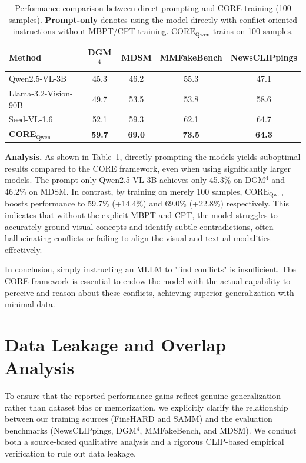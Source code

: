 \documentclass{article}
\theoremstyle{plain}
\theoremstyle{definition}
\theoremstyle{remark}
\begin{document}
\begin{table}[h]
\centering
\setlength{\tabcolsep}{4pt}
\caption{
Performance comparison between direct prompting and CORE training (100 samples). \textbf{Prompt-only} denotes using the model directly with conflict-oriented instructions without MBPT/CPT training. $\text{CORE}_\text{Qwen}$ trains on 100 samples.
}
\begin{tabular}{l cccc}
\toprule
\textbf{Method} & \textbf{DGM$^4$} & \textbf{MDSM} & \textbf{MMFakeBench} & \textbf{NewsCLIPpings} \\
\midrule

Qwen2.5-VL-3B & 45.3 & 46.2 & 55.3 & 47.1 \\
Llama-3.2-Vision-90B & 49.7 & 53.5 & 53.8 & 58.6 \\
Seed-VL-1.6 & 52.1 & 59.3 & 62.1 & 64.7 \\
\midrule

\rowcolor{LightGreen}
\textbf{CORE$_{\text{Qwen}}$} & \textbf{59.7} & \textbf{69.0} & \textbf{73.5} & \textbf{64.3} \\
\bottomrule
\end{tabular}
\small
\label{tab:prompt_vs_train}
\end{table}

\textbf{Analysis.} As shown in Table~\ref{tab:prompt_vs_train}, directly prompting the models yields suboptimal results compared to the CORE framework, even when using significantly larger models. 
The prompt-only Qwen2.5-VL-3B achieves only 45.3\% on DGM$^4$ and 46.2\% on MDSM. In contrast, by training on merely 100 samples, $\text{CORE}_\text{Qwen}$ boosts performance to 59.7\% (+14.4\%) and 69.0\% (+22.8\%) respectively. This indicates that without the explicit MBPT and CPT, the model struggles to accurately ground visual concepts and identify subtle contradictions, often hallucinating conflicts or failing to align the visual and textual modalities effectively.

In conclusion, simply instructing an MLLM to "find conflicts" is insufficient. The CORE framework is essential to endow the model with the actual capability to perceive and reason about these conflicts, achieving superior generalization with minimal data.

\section{Data Leakage and Overlap Analysis}
\label{sec:appendix_data_overlap}

To ensure that the reported performance gains reflect genuine generalization rather than dataset bias or memorization, we explicitly clarify the relationship between our training sources (FineHARD and SAMM) and the evaluation benchmarks (NewsCLIPpings, DGM$^4$, MMFakeBench, and MDSM). We conduct both a source-based qualitative analysis and a rigorous CLIP-based empirical verification to rule out data leakage.
\end{document}
